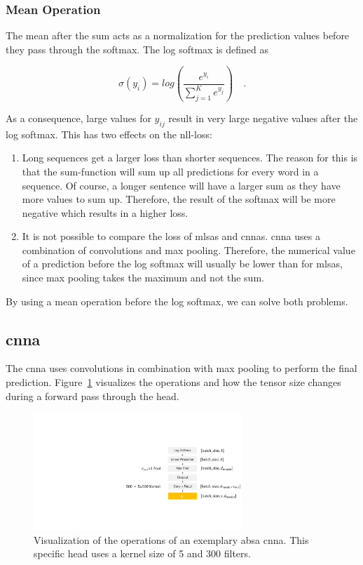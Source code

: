 \subsubsection*{Mean Operation}

The mean after the sum acts as a normalization for the prediction values before they pass through the softmax. The log softmax is defined as 

\begin{equation}
    \sigma(y_i)=log(\frac{e^{y_i}}{\sum_{j=1}^{K}e^{y_j}})\quad .
\end{equation}

As a consequence, large values for $y_{ij}$ result in very large negative values after the log softmax. This has two effects on the \gls{nll}-loss:

\begin{enumerate}
    \item Long sequences get a larger loss than shorter sequences. The reason for this is that the sum-function will sum up all predictions for every word in a sequence. Of course, a longer sentence will have a larger sum as they have more values to sum up. Therefore, the result of the softmax will be more negative which results in a higher loss.
    \item It is not possible to compare the loss of \glspl{mlsa} and \glspl{cnna}. \gls{cnna} uses a combination of convolutions and max pooling. Therefore, the numerical value of a prediction before the log softmax will usually be lower than for \glspl{mlsa}, since max pooling takes the maximum and not the sum.
\end{enumerate}

By using a mean operation before the log softmax, we can solve both problems.

\subsection{\acrfull{cnna}}
The \acrfull{cnna} uses convolutions in combination with max pooling to perform the final prediction. Figure~\ref{fig:04_ch1} visualizes the operations and how the tensor size changes during a forward pass through the head. 
\medskip
\begin{figure}[htp]
    \centering
    \includegraphics[width=0.7\textwidth]{figures/04_method/04_ch}
    \caption{Visualization of the operations of an exemplary \gls{absa} \acrfull{cnna}. This specific head uses a kernel size of 5 and 300 filters.}
    \label{fig:04_ch1}
\end{figure}

